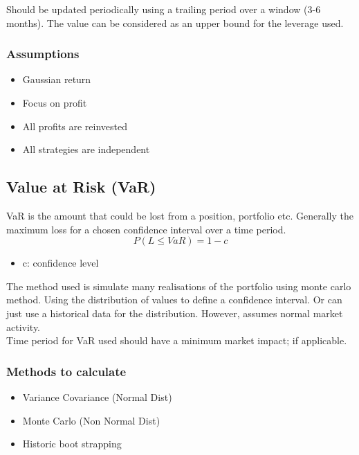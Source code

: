 \documentclass[11pt]{scrartcl} %
\begin{document}
Should be updated periodically using a trailing period over a window (3-6 months). The value
can be considered as an upper bound for the leverage used.

\subsubsection{Assumptions}

\begin{itemize}
	\item Gaussian return
	\item Focus on profit
	\item All profits are reinvested
	\item All strategies are independent
\end{itemize}

\subsection{Value at Risk (VaR)}

VaR is the amount that could be lost from a position, portfolio etc. Generally the maximum loss for a chosen
confidence interval over a time period.\\

\[ P(L\leq VaR) = 1 -c \]

\begin{itemize}
	\item c: confidence level
\end{itemize}

The method used is simulate many realisations of the portfolio using monte carlo method. Using the distribution 
of values to define a confidence interval. Or can just use a historical data for the distribution. However,
assumes normal market activity.\\

Time period for VaR used should have a minimum market impact; if applicable.

\subsubsection{Methods to calculate}

\begin{itemize}
	\item Variance Covariance (Normal Dist)
	\item Monte Carlo (Non Normal Dist)
	\item Historic boot strapping
\end{itemize}
\end{document}
